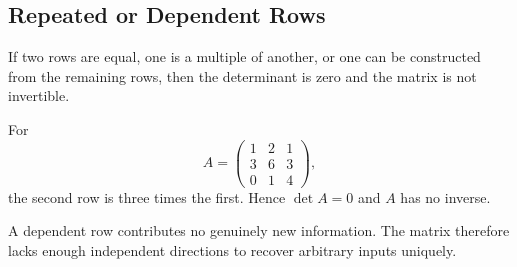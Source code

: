\subsection{Repeated or Dependent Rows}

If two rows are equal, one is a multiple of another, or one can be constructed from the remaining rows, then the determinant is zero and the matrix is not invertible.

\begin{examplebox}
For
\[
A=\begin{pmatrix}
1&2&1\\3&6&3\\0&1&4
\end{pmatrix},
\]
the second row is three times the first. Hence $\det A=0$ and $A$ has no inverse.
\end{examplebox}

\begin{interpretationbox}
A dependent row contributes no genuinely new information. The matrix therefore lacks enough independent directions to recover arbitrary inputs uniquely.
\end{interpretationbox}
